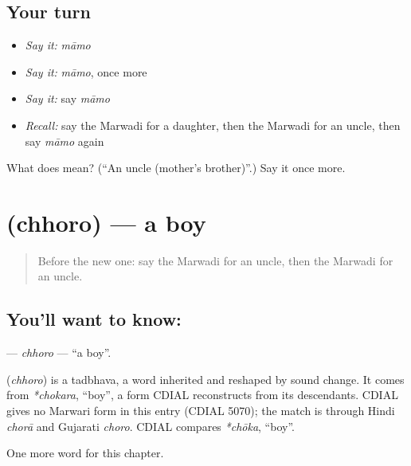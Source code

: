 \subsection*{Your turn}
\begin{itemize}
\raggedright
  \item \emph{Say it:} \emph{māmo}
  \item \emph{Say it:} \emph{māmo}, once more
  \item \emph{Say it:} say \emph{māmo}
  \item \emph{Recall:} say the Marwadi for a daughter, then the Marwadi for an uncle, then say \emph{māmo} again
\end{itemize}

\begin{tcolorbox}[breakable,colback=teal!4,colframe=teal!35!black,title={Before you move on}]
What does  mean? (\textquotedblleft{}An uncle (mother's brother)\textquotedblright{}.) Say it once more.
\end{tcolorbox}
\section[\texorpdfstring{\mw{छोरो} (chhoro)}{छोरो (chhoro)}]{ (chhoro) — a boy}

\label{lesson:MW-C49-chhoro}



\begin{quote}
Before the new one: say the Marwadi for an uncle, then the Marwadi for an uncle.
\end{quote}

\subsection*{You'll want to know: }
\textbf{} — \emph{chhoro} — \textquotedblleft{}a boy\textquotedblright{}.

\begin{cousinweb}
\textbf{} (\emph{chhoro}) is a tadbhava, a word inherited and reshaped by sound change. It comes from \emph{*chokara}, \textquotedblleft{}boy\textquotedblright{}, a form CDIAL reconstructs from its descendants. CDIAL gives no Marwari form in this entry (CDIAL 5070); the match is through Hindi \emph{chorā} and Gujarati \emph{choro}. CDIAL compares \emph{*chōka}, \textquotedblleft{}boy\textquotedblright{}.
\end{cousinweb}

\begin{grammarlens}[title={What you've built}]
One more word for this chapter.
\end{grammarlens}

